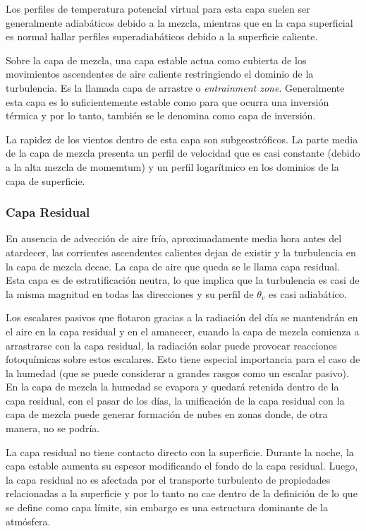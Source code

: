 Los perfiles de temperatura potencial virtual para esta capa suelen ser generalmente adiabáticos debido a la mezcla, mientras que en la capa superficial es normal hallar perfiles superadiabáticos debido a la superficie caliente.

Sobre la capa de mezcla, una capa estable actua como cubierta de los movimientos ascendentes de aire caliente restringiendo el dominio de la turbulencia. Es la llamada capa de arrastre o \emph{entrainment zone}. Generalmente esta capa es lo suficientemente estable como para que ocurra una inversión térmica y por lo tanto, también se le denomina como capa de inversión.

La rapidez de los vientos dentro de esta capa son subgeostróficos. La parte media de la capa de mezcla presenta un perfil de velocidad que es casi constante (debido a la alta mezcla de momemtum) y un perfil logarítmico en los dominios de la capa de superficie.

\subsubsection{Capa Residual}
En ausencia de advección de aire frío, aproximadamente media hora antes del atardecer, las corrientes ascendentes calientes dejan de existir y la turbulencia en la capa de mezcla decae. La capa de aire que queda se le llama capa residual. Esta capa es de estratificación neutra, lo que implica que la turbulencia es casi de la misma magnitud en todas las direcciones y su perfil de $\theta_v$ es casi adiabático.

Los escalares pasivos que flotaron gracias a la radiación del día se mantendrán en el aire en la capa residual y en el amanecer, cuando la capa de mezcla comienza a arrastrarse con la capa residual, la radiación solar puede provocar reacciones fotoquímicas sobre estos escalares. Esto tiene especial importancia para el caso de la humedad (que se puede considerar a grandes rasgos como un escalar pasivo). En la capa de mezcla la humedad se evapora y quedará retenida dentro de la capa residual, con el pasar de los días, la unificación de la capa residual con la capa de mezcla puede generar formación de nubes en zonas donde, de otra manera, no se podría.

La capa residual no tiene contacto directo con la superficie. Durante la noche, la capa estable aumenta su espesor modificando el fondo de la capa residual. Luego, la capa residual no es afectada por el transporte turbulento de propiedades relacionadas a la superficie y por lo tanto no cae dentro de la definición de lo que se define como capa límite, sin embargo es una estructura dominante de la atmósfera.
